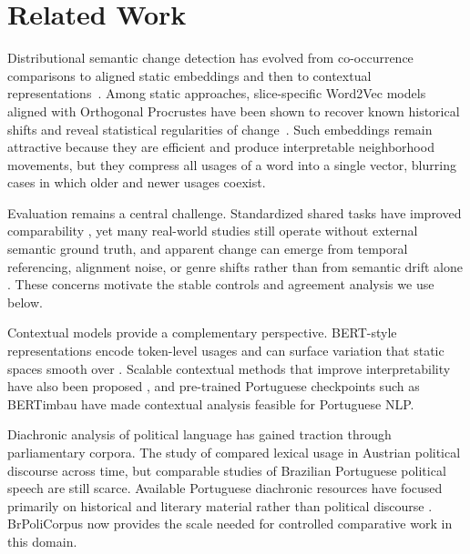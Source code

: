 \documentclass[12pt]{article}
\begin{document}
\section{Related Work}
\label{sec:related_work}

Distributional semantic change detection has evolved from co-occurrence
comparisons to aligned static embeddings and then to contextual
representations~\cite{kutuzov-etal-2018-diachronic,tahmasebi-etal-2021-computational}.
Among static approaches, slice-specific Word2Vec models aligned with Orthogonal
Procrustes have been shown to recover known historical shifts and reveal
statistical regularities of
change~\cite{hamilton-etal-2016-diachronic}.
Such embeddings remain attractive because they are efficient and produce
interpretable neighborhood movements, but they compress all usages of a word
into a single vector, blurring cases in which older and newer usages coexist.

Evaluation remains a central challenge. Standardized shared tasks have improved
comparability \cite{schlechtweg-etal-2020-semeval}, yet many real-world studies
still operate without external semantic ground truth, and apparent change can
emerge from temporal referencing, alignment noise, or genre shifts rather than
from semantic drift alone \cite{dubossarsky-etal-2019-timeout}. These concerns
motivate the stable controls and agreement analysis we use below.

Contextual models provide a complementary perspective. BERT-style representations encode token-level usages and can surface variation that static spaces smooth over \cite{giulianelli-etal-2020-analysing,devlin-etal-2019-bert}.
Scalable contextual methods that improve interpretability have also been
proposed \cite{montariol-etal-2021-scalable}, and pre-trained Portuguese
checkpoints such as BERTimbau \cite{souza-etal-2020-bertimbau} have made
contextual analysis feasible for Portuguese NLP\@. %

Diachronic analysis of political language has gained traction through
parliamentary corpora. The study of \cite{hofmann-etal-2020-comparing}
compared lexical usage in Austrian political discourse across time, but
comparable studies of Brazilian Portuguese political speech are still scarce.
Available Portuguese diachronic resources have focused primarily on historical
and literary material rather than political discourse
\cite{osorio-cardoso-2025-historical}. BrPoliCorpus
\cite{lima-lopes-2025-brpolicorpus} now provides the scale needed for
controlled comparative work in this domain.
\end{document}
